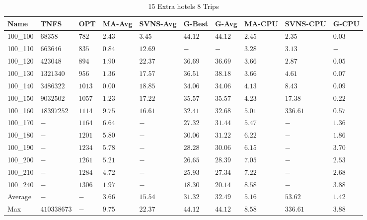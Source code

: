 \begin{center}
\begin{table}[]
\centering
\begin{tabular}{|lll|l|l|ll|lll|}
\hline
Name     & TNFS        & OPT    & MA-Avg & SVNS-Avg & G-Best & G-Avg & MA-CPU  & SVNS-CPU & G-CPU \\
\hline
100\_100 & $68358    $ & $782 $ & $2.43$ & $3.45 $  & $44.12$    & $44.12$   & $2.45$  & $2.35  $ & $0.03$ \\
100\_110 & $663646   $ & $835 $ & $0.84$ & $12.69$  & $-    $    & $-    $   & $3.28$  & $3.13  $ & $-   $ \\
100\_120 & $423048   $ & $894 $ & $1.90$ & $22.37$  & $36.69$    & $36.69$   & $3.66$  & $2.87  $ & $0.05$ \\
100\_130 & $1321340  $ & $956 $ & $1.36$ & $17.57$  & $36.51$    & $38.18$   & $3.66$  & $4.61  $ & $0.07$ \\
100\_140 & $3486322  $ & $1013$ & $\bm{0.00}$ & $18.85$  & $34.06$    & $34.06$   & $4.13$  & $8.43  $ & $0.09$ \\
100\_150 & $9032502  $ & $1057$ & $1.23$ & $17.22$  & $35.57$    & $35.57$   & $4.23$  & $17.38 $ & $0.22$ \\
100\_160 & $18397252 $ & $1114$ & $9.75$ & $16.61$  & $32.41$    & $32.68$   & $5.01$  & $336.61$ & $0.57$ \\
100\_170 & $-        $ & $1164$ & $6.64$ & $-    $  & $27.32$    & $31.44$   & $5.47$  & $-     $ & $1.36$ \\
100\_180 & $-        $ & $1201$ & $5.80$ & $-    $  & $30.06$    & $31.22$   & $6.22$  & $-     $ & $1.86$ \\
100\_190 & $-        $ & $1234$ & $5.78$ & $-    $  & $28.28$    & $30.06$   & $6.15$  & $-     $ & $3.70$ \\
100\_200 & $-        $ & $1261$ & $5.21$ & $-    $  & $26.65$    & $28.39$   & $7.05$  & $-     $ & $2.53$ \\
100\_210 & $-        $ & $1284$ & $4.72$ & $-    $  & $25.93$    & $27.34$   & $7.22$  & $-     $ & $2.68$ \\
100\_240 & $-        $ & $1306$ & $1.97$ & $-    $  & $18.30$    & $20.14$   & $8.58$  & $-     $ & $3.88$ \\
\hline
Average  & $-        $ & $-   $ & $3.66$ & $15.54$  & $31.32$    & $32.49$   & $5.16$  & $53.62 $ & $1.42$ \\
Max      & $410338673$ & $-   $ & $9.75$ & $22.37$  & $44.12$    & $44.12$   & $8.58$  & $336.61$ & $3.88$ \\
\hline
\end{tabular}
\caption{15 Extra hotels 8 Trips}
\label{15-8}
\end{table}
\end{center}
